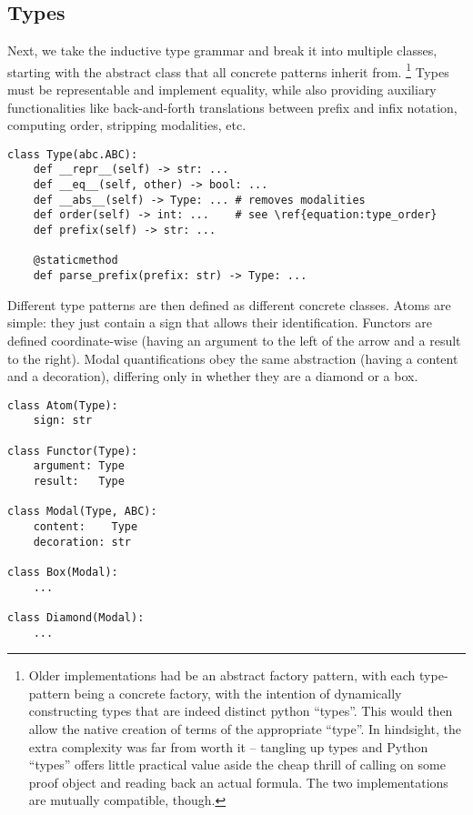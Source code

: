\subsection{Types}
Next, we take the inductive type grammar and break it into multiple classes, starting with the abstract class that all concrete patterns inherit from.%
	\footnote{Older implementations had  be an abstract factory pattern, with each type-pattern being a concrete factory, with the intention of dynamically constructing types that are indeed distinct python ``types''.
	This would then allow the native creation of terms of the appropriate ``type''. 
	In hindsight, the extra complexity was far from worth it -- tangling up \LPplus{} types and Python ``types'' offers little practical value aside the cheap thrill of calling  on some proof object and reading back an actual formula.
	The two implementations are mutually compatible, though.}
Types must be representable and implement equality, while also providing auxiliary functionalities like back-and-forth translations between prefix and infix notation, computing order, stripping modalities, etc.

\begin{verbatim}
class Type(abc.ABC): 
	def __repr__(self) -> str: ...
	def __eq__(self, other) -> bool: ...
	def __abs__(self) -> Type: ... # removes modalities
	def order(self) -> int: ...    # see \ref{equation:type_order}
	def prefix(self) -> str: ...  
	
	@staticmethod
	def parse_prefix(prefix: str) -> Type: ...  
\end{verbatim}

\noindent Different type patterns are then defined as different concrete classes.
Atoms are simple: they just contain a sign that allows their identification.
Functors are defined coordinate-wise (having an argument to the left of the arrow and a result to the right).
Modal quantifications obey the same abstraction (having a content and a decoration), differing only in whether they are a diamond or a box.

\begin{verbatim}
class Atom(Type):
	sign: str

class Functor(Type):
	argument: Type
	result:   Type
	
class Modal(Type, ABC):
	content:    Type
	decoration: str
	
class Box(Modal):
	...
	
class Diamond(Modal):
	...
\end{verbatim}

